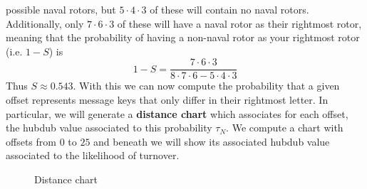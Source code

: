 possible naval rotors, but $5\cdot4\cdot3$ of these will contain no
naval rotors. Additionally, only $7\cdot6\cdot3$ of these will have
a naval rotor as their rightmost rotor, meaning that the
probability of having a non-naval rotor as your rightmost rotor
(i.e. $1-S$) is
\[
  1-S = \frac{7\cdot6\cdot3}{8\cdot7\cdot6 - 5\cdot4\cdot3}
\]
Thus $S\approx0.543$. With this we can now compute the probability
that a given offset represents message keys that only differ in
their rightmost letter. In particular, we will generate a
{\bf{distance chart}} which associates for each offset, the hubdub
value associated to this probability $\tau_N$. We compute a chart
with offsets from $0$ to $25$ and beneath we will show its
associated hubdub value associated to the likelihood of turnover.
\begin{figure}[H]
  \begin{center}
  \end{center}
  \caption{Distance chart}
  \label{fig:distance_chart}
\end{figure}
